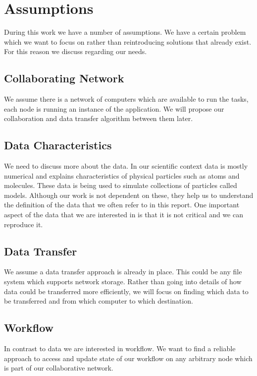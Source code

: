 \section{Assumptions}
During this work we have a number of assumptions. We have a certain problem which we want to focus
on rather than reintroducing solutions that already exist. For this reason we discuss regarding our 
needs.

\subsection{Collaborating Network}
We assume there is a network of computers which are available to run the tasks, each node is running an instance
of the application. We will propose our collaboration and data transfer algorithm between them later.

\subsection{Data Characteristics}
We need to discuss more about the data. In our scientific context data is mostly numerical and explains characteristics
of physical particles such as atoms and molecules. These data is being used to simulate collections of particles called
models. Although our work is not dependent on these, they help us to understand the definition of the data that
we often refer to in this report. One important aspect of the data that we are interested in is that it is not critical 
and we can reproduce it. 

\subsection{Data Transfer}
We assume a data transfer approach is already in place. This could be any file system which supports 
network storage. Rather than going into details of how data could be transferred more efficiently, we will
focus on finding which data to be transferred and from which computer to which destination.

\subsection{Workflow}
In contrast to data we are interested in workflow. We want to find a reliable approach to access and update 
state of our workflow on any arbitrary node which is part of our collaborative network.